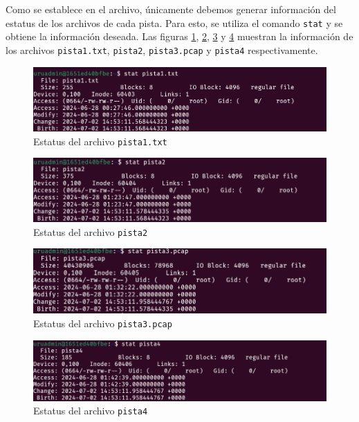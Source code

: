 \documentclass{article}
\begin{document}
Como se establece en el archivo, únicamente debemos generar información del estatus de los archivos de cada pista. Para esto, se utiliza el comando \texttt{stat} y se obtiene la información deseada. Las figuras \ref{fig:pista1_stat}, \ref{fig:pista2_stat}, \ref{fig:pista3_stat} y \ref{fig:pista4_stat} muestran la información de los archivos \texttt{pista1.txt}, \texttt{pista2}, \texttt{pista3.pcap} y \texttt{pista4} respectivamente.

\begin{figure}[ht!]
  \includegraphics[width=\textwidth]{pista1_stat.png}
  \caption{Estatus del archivo \texttt{pista1.txt}}
  \label{fig:pista1_stat}
\end{figure}

\begin{figure}[ht!]
  \includegraphics[width=\textwidth]{pista2_stat.png}
  \caption{Estatus del archivo \texttt{pista2}}
  \label{fig:pista2_stat}
\end{figure}

\begin{figure}[ht!]
  \includegraphics[width=\textwidth]{pista3_stat.png}
  \caption{Estatus del archivo \texttt{pista3.pcap}}
  \label{fig:pista3_stat}
\end{figure}

\begin{figure}[ht!]
  \includegraphics[width=\textwidth]{pista4_stat.png}
  \caption{Estatus del archivo \texttt{pista4}}
  \label{fig:pista4_stat}
\end{figure}
\end{document}

